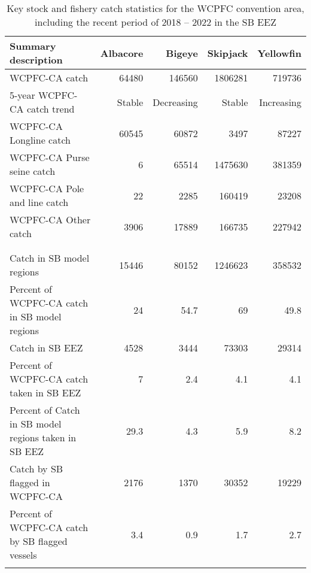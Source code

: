 \begin{longtable}{lrrrr}
\caption{Key stock and fishery catch statistics for the WCPFC convention area, including the recent period of 2018 -- 2022 in the SB EEZ} \\ 
  \hline
Summary description & Albacore & Bigeye & Skipjack & Yellowfin \\ 
  \hline
WCPFC-CA catch & 64480 & 146560 & 1806281 & 719736 \\ 
  5-year WCPFC-CA catch trend & Stable & Decreasing & Stable & Increasing \\ 
  WCPFC-CA Longline catch & 60545 & 60872 & 3497 & 87227 \\ 
  WCPFC-CA Purse seine catch & 6 & 65514 & 1475630 & 381359 \\ 
  WCPFC-CA Pole and line catch & 22 & 2285 & 160419 & 23208 \\ 
  WCPFC-CA Other catch & 3906 & 17889 & 166735 & 227942 \\ 
   &  &  &  &  \\ 
   &  &  &  &  \\ 
   \hline
Catch in SB model regions & 15446 & 80152 & 1246623 & 358532 \\ 
  Percent of WCPFC-CA catch in SB model regions & 24 & 54.7 & 69 & 49.8 \\ 
  Catch in SB EEZ & 4528 & 3444 & 73303 & 29314 \\ 
  Percent of WCPFC-CA catch taken in SB EEZ & 7 & 2.4 & 4.1 & 4.1 \\ 
  Percent of Catch in SB model regions taken in SB EEZ & 29.3 & 4.3 & 5.9 & 8.2 \\ 
  Catch by SB flagged in WCPFC-CA & 2176 & 1370 & 30352 & 19229 \\ 
  Percent of WCPFC-CA catch by SB flagged vessels & 3.4 & 0.9 & 1.7 & 2.7 \\ 
  \hline
\label{cat_sum_tab}
\end{longtable}
